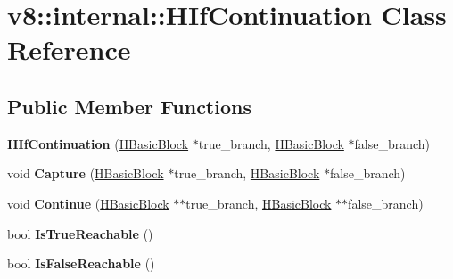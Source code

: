 \hypertarget{classv8_1_1internal_1_1_h_if_continuation}{}\section{v8\+:\+:internal\+:\+:H\+If\+Continuation Class Reference}
\label{classv8_1_1internal_1_1_h_if_continuation}
\subsection*{Public Member Functions}
\begin{DoxyCompactItemize}
\item 
{\bfseries H\+If\+Continuation} (\hyperlink{classv8_1_1internal_1_1_h_basic_block}{H\+Basic\+Block} $\ast$true\+\_\+branch, \hyperlink{classv8_1_1internal_1_1_h_basic_block}{H\+Basic\+Block} $\ast$false\+\_\+branch)\hypertarget{classv8_1_1internal_1_1_h_if_continuation_a8af59ecd0af9081b4b63cf6db796ee0f}{}\label{classv8_1_1internal_1_1_h_if_continuation_a8af59ecd0af9081b4b63cf6db796ee0f}

\item 
void {\bfseries Capture} (\hyperlink{classv8_1_1internal_1_1_h_basic_block}{H\+Basic\+Block} $\ast$true\+\_\+branch, \hyperlink{classv8_1_1internal_1_1_h_basic_block}{H\+Basic\+Block} $\ast$false\+\_\+branch)\hypertarget{classv8_1_1internal_1_1_h_if_continuation_a13d73733b9078d5705473e3ec3f962d9}{}\label{classv8_1_1internal_1_1_h_if_continuation_a13d73733b9078d5705473e3ec3f962d9}

\item 
void {\bfseries Continue} (\hyperlink{classv8_1_1internal_1_1_h_basic_block}{H\+Basic\+Block} $\ast$$\ast$true\+\_\+branch, \hyperlink{classv8_1_1internal_1_1_h_basic_block}{H\+Basic\+Block} $\ast$$\ast$false\+\_\+branch)\hypertarget{classv8_1_1internal_1_1_h_if_continuation_aa44452573286da84c9ff38df6be6cc44}{}\label{classv8_1_1internal_1_1_h_if_continuation_aa44452573286da84c9ff38df6be6cc44}

\item 
bool {\bfseries Is\+True\+Reachable} ()\hypertarget{classv8_1_1internal_1_1_h_if_continuation_a50feb33736874788a964dabc8ed13016}{}\label{classv8_1_1internal_1_1_h_if_continuation_a50feb33736874788a964dabc8ed13016}

\item 
bool {\bfseries Is\+False\+Reachable} ()\hypertarget{classv8_1_1internal_1_1_h_if_continuation_a33c8ff6e204d9398199026773c7ede95}{}\label{classv8_1_1internal_1_1_h_if_continuation_a33c8ff6e204d9398199026773c7ede95}


\end{DoxyCompactItemize}
